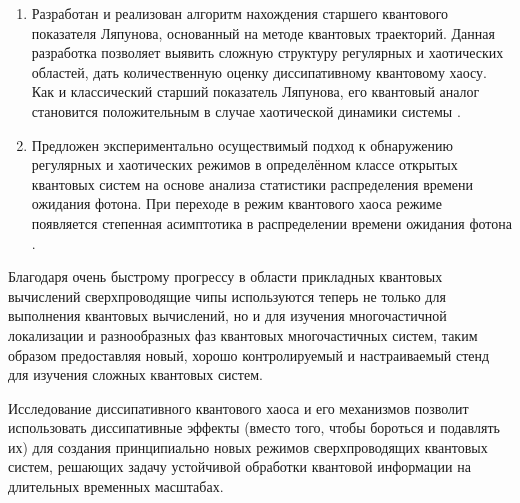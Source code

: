 \begin{enumerate}[beginpenalty=10000]
	\item Разработан и реализован алгоритм нахождения старшего квантового показателя Ляпунова, основанный на методе квантовых траекторий. Данная разработка позволяет выявить сложную структуру регулярных и хаотических областей, дать количественную оценку диссипативному квантовому хаосу. Как и классический старший показатель Ляпунова, его квантовый аналог становится положительным в случае хаотической динамики системы \cite{Yusipov2019_2}.
	\item Предложен экспериментально осуществимый подход к обнаружению регулярных и хаотических режимов в определённом классе открытых квантовых систем на основе анализа статистики распределения времени ожидания фотона. При переходе в режим квантового хаоса режиме появляется степенная асимптотика в распределении времени ожидания фотона \cite{Yusipov2020}.
\end{enumerate}

Благодаря очень быстрому прогрессу в области прикладных квантовых вычислений сверхпроводящие чипы используются теперь не только для выполнения квантовых вычислений, но и для изучения многочастичной локализации и разнообразных фаз квантовых многочастичных систем, таким образом предоставляя новый, хорошо контролируемый и настраиваемый стенд для изучения сложных квантовых систем. 

Исследование диссипативного квантового хаоса и его механизмов позволит использовать диссипативные эффекты (вместо того, чтобы бороться и подавлять их) для создания принципиально новых режимов сверхпроводящих квантовых систем, решающих задачу устойчивой обработки квантовой информации на длительных временных масштабах.
